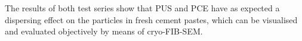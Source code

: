 The results of both test series show that \ac{PUS} and \ac{PCE} have as expected a dispersing effect on the particles in fresh cement pastes, which can be visualised and evaluated objectively by means of cryo-\ac{FIB}-\ac{SEM}. %


